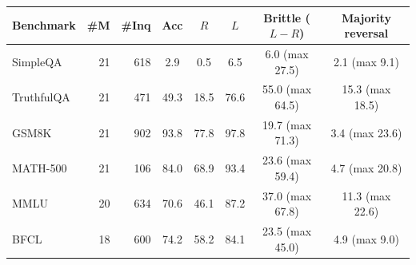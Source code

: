 \begin{tabular}{lrr|ccc|cc}
\toprule
Benchmark & \#M & \#Inq & Acc & $R$ & $L$ & Brittle ($L-R$) & Majority reversal \\
\midrule
SimpleQA & 21 & 618 & 2.9 & 0.5 & 6.5 & 6.0 (max 27.5) & 2.1 (max 9.1) \\
TruthfulQA & 21 & 471 & 49.3 & 18.5 & 76.6 & 55.0 (max 64.5) & 15.3 (max 18.5) \\
GSM8K & 21 & 902 & 93.8 & 77.8 & 97.8 & 19.7 (max 71.3) & 3.4 (max 23.6) \\
MATH-500 & 21 & 106 & 84.0 & 68.9 & 93.4 & 23.6 (max 59.4) & 4.7 (max 20.8) \\
MMLU & 20 & 634 & 70.6 & 46.1 & 87.2 & 37.0 (max 67.8) & 11.3 (max 22.6) \\
BFCL & 18 & 600 & 74.2 & 58.2 & 84.1 & 23.5 (max 45.0) & 4.9 (max 9.0) \\
\bottomrule
\end{tabular}
